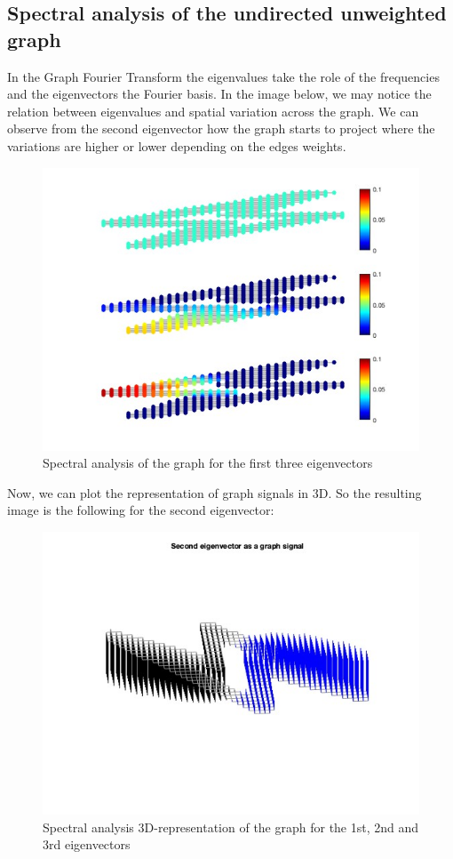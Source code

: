 \documentclass[12pt]{article}
\begin{document}
\subsection{Spectral analysis of the undirected unweighted graph}
\justifying
In the Graph Fourier Transform the eigenvalues take the role of the frequencies and the eigenvectors the Fourier basis. In the image below, we may notice the relation between eigenvalues and spatial variation across the graph. We can observe from the second eigenvector how the graph starts to project where the variations are higher or lower depending on the edges weights.
\begin{figure}[H]
	\centering
	\includegraphics[width=12cm]{thunder_graph_2d_123ev.jpg}
	\caption{Spectral analysis of the graph for the first three eigenvectors}
	\label{fig:Graphd2dFirstEV}
\end{figure}
Now, we can plot the representation of graph signals in 3D. So the resulting image is the following for the second eigenvector:

\begin{figure}[H]
	\centering
	\includegraphics[width=12cm]{thunder_3d_123ev.jpg}
	\caption{Spectral analysis 3D-representation of the graph for the 1st, 2nd and 3rd eigenvectors}
	\label{fig:Graphd3dFirstEV}
\end{figure}
\end{document}
